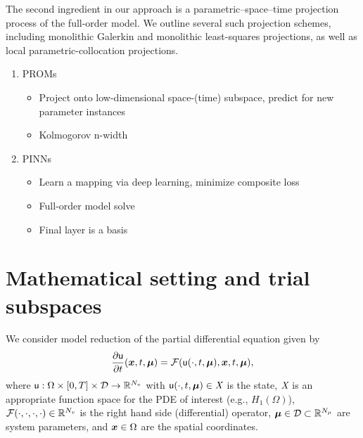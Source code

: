 \documentclass[3p,computermodern,10pt]{elsarticle}
\begin{document}
The second ingredient in our approach is a parametric--space--time projection process of the full-order model. We outline several such projection schemes, including monolithic Galerkin and monolithic least-squares projections, as well as local parametric-collocation projections.  
  
\begin{enumerate}
\item PROMs
\begin{itemize}
\item Project onto low-dimensional space-(time) subspace, predict for new parameter instances
\item Kolmogorov n-width
\end{itemize}
\item PINNs
\begin{itemize}
\item Learn a mapping via deep learning, minimize composite loss
\item Full-order model solve
\item Final layer is a basis
\end{itemize}
\end{enumerate}  
\section{Mathematical setting and trial subspaces}
We consider model reduction of the partial differential equation given by
\begin{equation}\label{eq:fom}
\frac{\partial \mathsf{u}}{\partial t}(\boldsymbol x, t,\boldsymbol \mu) = \mathcal{F}(\mathsf{u}(\cdot,t,\boldsymbol \mu),\boldsymbol x, t,\boldsymbol \mu), 
\end{equation}
where $\mathsf{u}: \Omega \times [0,T] \times \mathcal{D} \rightarrow \mathbb{R}^{N_v}$ with $\mathsf{u}(\cdot,t,\boldsymbol \mu) \in \textit{X}$ is the state, $\textit{X}$ is an appropriate function space for the PDE of interest (e.g., $H_1(\Omega)$), $\mathcal{F}(\cdot,\cdot,\cdot,\cdot) \in \mathbb{R}^{N_v}$ is the right hand side (differential) operator, $\boldsymbol \mu \in \mathcal{D} \subset \mathbb{R}^{N_{\mu}}$  are system parameters, and $\boldsymbol x \in \Omega$ are the spatial coordinates.
\end{document}
